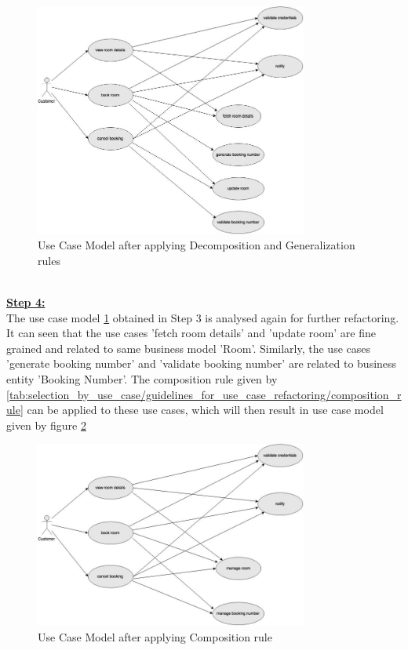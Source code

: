 \\
\begin{figure}[H]
\begin{center}
\includegraphics[width=0.8\textwidth]{figures/use-case-three}
\caption{Use Case Model after applying Decomposition and Generalization rules}
\label{fig:selection_by_use_case/use_case_three}
\end{center}
\end{figure}
\\
\textbf{\underline{Step 4:}}
\\
The use case model \ref{fig:selection_by_use_case/use_case_three} obtained in Step 3 is analysed again for further refactoring. It can seen that the use cases 'fetch room details' and 'update room' are fine grained and related to same business model 'Room'. Similarly, the use cases 'generate booking number' and 'validate booking number' are related to business entity 'Booking Number'. The composition rule given by \ref{tab:selection_by_use_case/guidelines_for_use_case_refactoring/composition_rule} can be applied to these use cases, which will then result in use case model given by figure \ref{fig:selection_by_use_case/use_case_four}
\\
\begin{figure}[H]
\begin{center}
\includegraphics[width=0.8\textwidth]{figures/use-case-four}
\caption{Use Case Model after applying Composition rule}
\label{fig:selection_by_use_case/use_case_four}
\end{center}
\end{figure}
